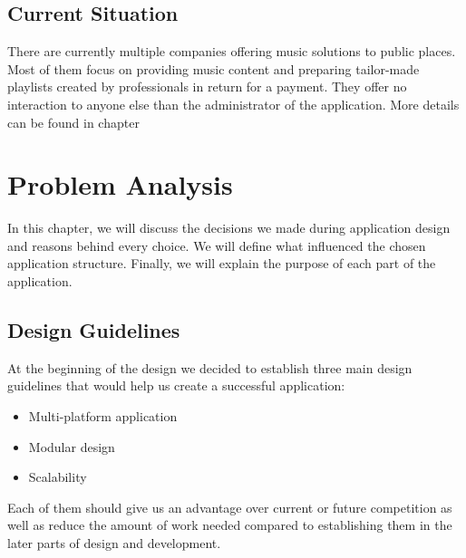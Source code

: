 \section*{Current Situation}

There are currently multiple companies offering music solutions to public places. Most of them focus on providing music content and preparing tailor-made playlists created by professionals in return for a payment. They offer no interaction to anyone else than the administrator of the application. More details can be found in chapter 


\chapter{Problem Analysis}

In this chapter, we will discuss the decisions we made during application design and reasons behind every choice. We will define what influenced the chosen application structure. Finally, we will explain the purpose of each part of the application.

\section{Design Guidelines}
At the beginning of the design we decided to establish three main design guidelines that would help us create a successful application:
\begin{itemize}
    \item Multi-platform application
    \item Modular design
    \item Scalability
\end{itemize}
Each of them should give us an advantage over current or future competition as well as reduce the amount of work needed compared to establishing them in the later parts of design and development.

